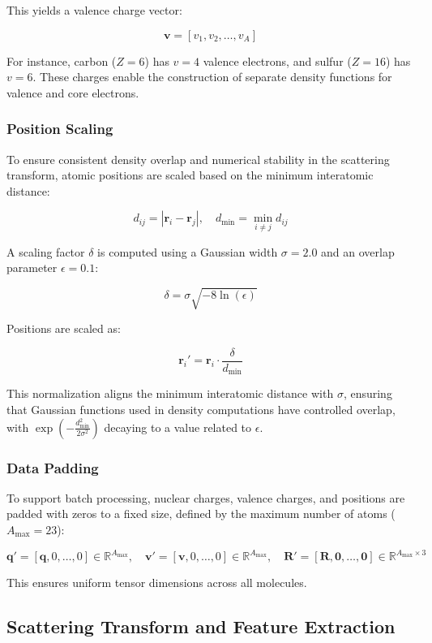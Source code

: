 \documentclass{article}
\begin{document}
This yields a valence charge vector:

\[
\mathbf{v} = [v_1, v_2, \ldots, v_A]
\]

For instance, carbon ($Z = 6$) has $v = 4$ valence electrons, and sulfur ($Z = 16$) has $v = 6$. These charges enable the construction of separate density functions for valence and core electrons.

\subsubsection{Position Scaling}

To ensure consistent density overlap and numerical stability in the scattering transform, atomic positions are scaled based on the minimum interatomic distance:

\[
d_{ij} = |\mathbf{r}_i - \mathbf{r}_j|, \quad d_{\text{min}} = \min_{i \neq j} d_{ij}
\]

A scaling factor $\delta$ is computed using a Gaussian width $\sigma = 2.0$ and an overlap parameter $\epsilon = 0.1$:

\[
\delta = \sigma \sqrt{-8 \ln(\epsilon)}
\]

Positions are scaled as:

\[
\mathbf{r}_i' = \mathbf{r}_i \cdot \frac{\delta}{d_{\text{min}}}
\]

This normalization aligns the minimum interatomic distance with $\sigma$, ensuring that Gaussian functions used in density computations have controlled overlap, with $\exp\left(-\frac{d_{\text{min}}^2}{2\sigma^2}\right)$ decaying to a value related to $\epsilon$.

\subsubsection{Data Padding}

To support batch processing, nuclear charges, valence charges, and positions are padded with zeros to a fixed size, defined by the maximum number of atoms ($A_{\text{max}} = 23$):

\[
\mathbf{q}' = [\mathbf{q}, 0, \ldots, 0] \in \mathbb{R}^{A_{\text{max}}}, \quad \mathbf{v}' = [\mathbf{v}, 0, \ldots, 0] \in \mathbb{R}^{A_{\text{max}}}, \quad \mathbf{R}' = [\mathbf{R}, \mathbf{0}, \ldots, \mathbf{0}] \in \mathbb{R}^{A_{\text{max}} \times 3}
\]

This ensures uniform tensor dimensions across all molecules.

\subsection{Scattering Transform and Feature Extraction}
\end{document}
